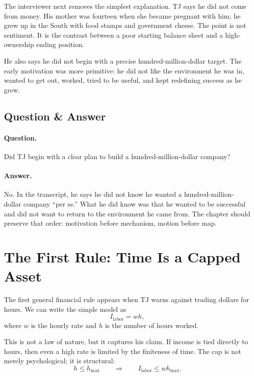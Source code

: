The interviewer next removes the simplest explanation. TJ says he did not come from money. His mother was fourteen when she became pregnant with him; he grew up in the South with food stamps and government cheese. The point is not sentiment. It is the contrast between a poor starting balance sheet and a high-ownership ending position.

He also says he did not begin with a precise hundred-million-dollar target. The early motivation was more primitive: he did not like the environment he was in, wanted to get out, worked, tried to be useful, and kept redefining success as he grew.

\subsection{Question \& Answer}

\paragraph{Question.} Did TJ begin with a clear plan to build a hundred-million-dollar company?

\paragraph{Answer.} No. In the transcript, he says he did not know he wanted a hundred-million-dollar company ``per se.'' What he did know was that he wanted to be successful and did not want to return to the environment he came from. The chapter should preserve that order: motivation before mechanism, motion before map.

\section{The First Rule: Time Is a Capped Asset}

The first general financial rule appears when TJ warns against trading dollars for hours. We can write the simple model as
\begin{equation}
I_{\mathrm{labor}} = w h,
\end{equation}
where \(w\) is the hourly rate and \(h\) is the number of hours worked.

This is not a law of nature, but it captures his claim. If income is tied directly to hours, then even a high rate is limited by the finiteness of time. The cap is not merely psychological; it is structural:
\begin{equation}
h \leq h_{\max}
\qquad\Longrightarrow\qquad
I_{\mathrm{labor}} \leq w h_{\max}.
\end{equation}

